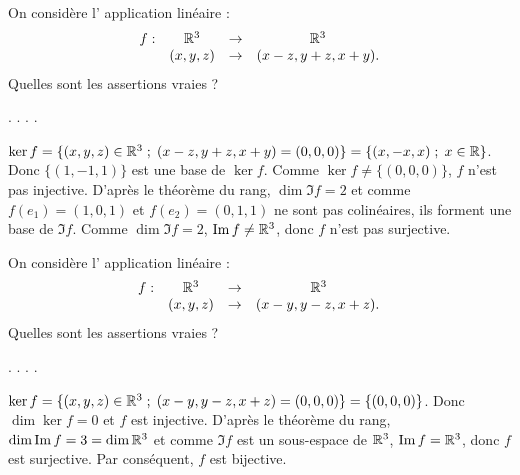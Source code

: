 \begin{question}
On considère l' application linéaire : 
$$\begin{array}{rccc}f:&\mathbb{R}^3&\to&\mathbb{R}^3\\
& (x,y,z)&\to &(x-z,y+z,x+y). \end{array}$$
Quelles sont les assertions vraies ?
\begin{answers}  
.
.
.
.
\end{answers}
\begin{explanations} $\ker f = \{(x,y,z) \in \mathbb{R}^3 \; ; \; (x-z,y+z,x+y)=(0,0,0)\} = \{(x,-x,x)  \; ; \; x\in \mathbb{R}\}$. Donc $ \{(1,-1,1)\}$ est une base de $\ker f$. Comme $\ker f \neq \{(0,0,0)\}$, $f$ n'est pas injective.
\vskip0mm
D'après le théorème du rang, $\dim \Im f = 2 $ et comme 
$f(e_1)=(1,0,1)$ et $ f(e_2)=(0,1,1)$ ne sont pas colinéaires, ils forment une base de  $\Im f$. Comme $\dim \Im f = 2 $, $\mathop{\mathrm{Im}}\nolimits f \neq \mathbb{R}^3 $, donc $f$ n'est pas surjective.
\end{explanations}
\end{question}

\begin{question}
On considère l' application linéaire : 
$$\begin{array}{rccc}f:&\mathbb{R}^3&\to&\mathbb{R}^3\\
& (x,y,z)&\to &(x-y,y-z,x+z). \,  \end{array}$$
Quelles sont les assertions vraies ?
\begin{answers}  
.
.
.
.
\end{answers}
\begin{explanations} $\ker f = \{(x,y,z) \in \mathbb{R}^3 \; ; \; (x-y,y-z,x+z)=(0,0,0)\} = \{(0,0,0)\}$. Donc $\dim \ker f = 0$ et  $f$ est injective.
\vskip0mm
D'après le théorème du rang, $\dim \mathop{\mathrm{Im}}\nolimits f = 3=\dim \mathbb{R}^3$ et comme $\Im f$ est un sous-espace de $\mathbb{R}^3$, $\mathop{\mathrm{Im}}\nolimits f=\mathbb{R}^3$, donc $f$ est surjective. Par conséquent, $f$ est bijective.
\end{explanations}
\end{question}


